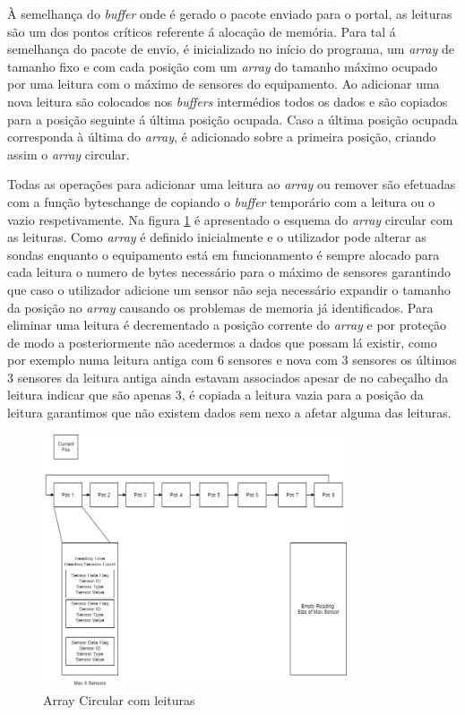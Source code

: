 \par À semelhança do \textit{buffer} onde é gerado o pacote enviado para o portal, as leituras são um dos pontos críticos referente á alocação de memória. Para tal á semelhança do pacote de envio, é inicializado no início do programa, um \textit{array} de tamanho fixo e com cada posição com um \textit{array} do tamanho máximo ocupado por uma leitura com o máximo de sensores do equipamento. Ao adicionar uma nova leitura são colocados nos \textit{buffers} intermédios todos os dados e são copiados para a posição seguinte á última posição ocupada. Caso a última posição ocupada corresponda à última do \textit{array}, é adicionado sobre a primeira posição, criando assim o \textit{array} circular.
\par Todas as operações para adicionar uma leitura ao \textit{array} ou remover são efetuadas com a função byteschange de copiando o \textit{buffer} temporário com a leitura ou o vazio respetivamente. Na figura \ref{circbuf} é apresentado o esquema do \textit{array} circular com as leituras. Como \textit{array} é definido inicialmente e o utilizador pode alterar as sondas enquanto o equipamento está em funcionamento é sempre alocado para cada leitura o numero de bytes necessário para o máximo de sensores garantindo que caso o utilizador adicione um sensor não seja necessário expandir o tamanho da posição no \textit{array} causando os problemas de memoria já identificados. Para eliminar uma leitura é decrementado a posição corrente do \textit{array} e por proteção de modo a posteriormente não acedermos a dados que possam lá existir, como por exemplo numa leitura antiga com 6 sensores e nova com 3 sensores os últimos 3 sensores da leitura antiga ainda estavam associados apesar de no cabeçalho da leitura indicar que são apenas 3, é copiada a leitura vazia para a posição da leitura garantimos que não existem dados sem nexo a afetar alguma das leituras.


\begin{figure}[ht]
\centering
\includegraphics[width=0.80\textwidth]{images/circbuf.png}
\caption{Array Circular com leituras}\label{circbuf}
\end{figure}

